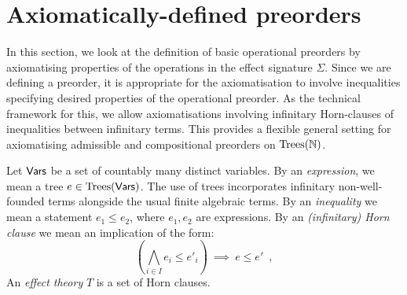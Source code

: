 \section{Axiomatically-defined preorders}
\label{section:axiomatic}

In this section, we look at the definition of basic operational preorders by axiomatising
properties of the operations in the effect signature $\Sigma$.
Since we are defining a preorder, it is appropriate for the axiomatisation to involve inequalities
specifying desired properties of the operational preorder. As the technical framework for this, we allow
axiomatisations involving infinitary Horn-clauses of inequalities between infinitary terms.  This provides a flexible general setting for
axiomatising admissible and compositional preorders on 
$\textnormal{Trees}(\mathbb{N})$. 

Let $\mathsf{Vars}$ be a set of countably many distinct variables. By an  \emph{expression}, we mean a
tree $e \in \textnormal{Trees}(\mathsf{Vars})$. The use of trees incorporates infinitary non-well-founded terms alongside the usual finite
algebraic terms. By an \emph{inequality} we mean a statement $e_1 \leq e_2$, where $e_1, e_2$ are expressions.
By an \emph{(infinitary) Horn clause} we mean an implication of the form:
\begin{equation}
\label{equation:horn-clause}
\left( \bigwedge_{i \in I} e_i \leq e'_i \right)~ \implies ~ e \leq e' \enspace ,
\end{equation}
An \emph{effect theory} $T$  is a set of Horn clauses.

